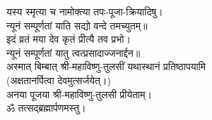 यस्य स्मृत्या च नामोक्त्या तपः-पूजा-क्रियादिषु।\\
न्यूनं सम्पूर्णतां याति सद्यो वन्दे तमच्युतम्॥ \\
इदं व्रतं मया देव कृतं प्रीत्यै तव प्रभो।\\
न्यूनं सम्पूर्णतां यातु त्वत्प्रसादाज्जनार्द्दन॥\\

अस्मात् बिम्बात् श्री-महाविष्णु-तुलसीं यथास्थानं प्रतिष्ठापयामि\\
(अक्षतानर्पित्वा देवमुत्सर्जयेत्।)\\
अनया पूजया श्री-महाविष्णु-तुलसी प्रीयेताम्। \\
ॐ तत्सद्ब्रह्मार्पणमस्तु।